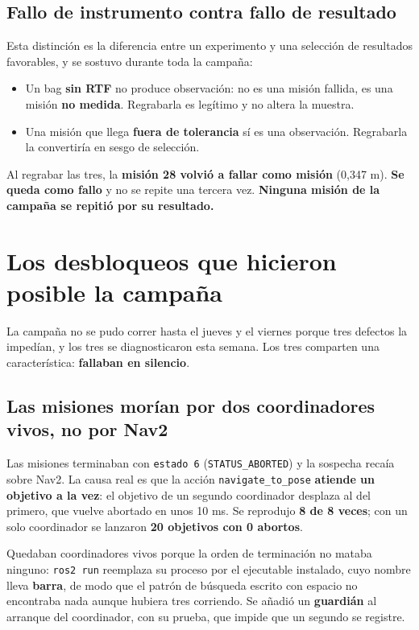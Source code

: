 \documentclass[12pt,letterpaper]{article}
\begin{document}
\subsection{Fallo de instrumento contra fallo de resultado}

Esta distinción es la diferencia entre un experimento y una selección de resultados favorables, y se sostuvo durante toda la campaña:

\begin{itemize}[leftmargin=*]
    \item Un bag \textbf{sin RTF} no produce observación: no es una misión fallida, es una misión \textbf{no medida}. Regrabarla es legítimo y no altera la muestra.
    \item Una misión que llega \textbf{fuera de tolerancia} sí es una observación. Regrabarla la convertiría en sesgo de selección.
\end{itemize}

Al regrabar las tres, la \textbf{misión 28 volvió a fallar como misión} (0,347 m). \textbf{Se queda como fallo} y no se repite una tercera vez. \textbf{Ninguna misión de la campaña se repitió por su resultado.}

\section{Los desbloqueos que hicieron posible la campaña}
\label{sec:desbloqueos}

La campaña no se pudo correr hasta el jueves y el viernes porque tres defectos la impedían, y los tres se diagnosticaron esta semana. Los tres comparten una característica: \textbf{fallaban en silencio}.

\subsection{Las misiones morían por dos coordinadores vivos, no por Nav2}

Las misiones terminaban con \texttt{estado 6} (\texttt{STATUS\_ABORTED}) y la sospecha recaía sobre Nav2. La causa real es que la acción \texttt{navigate\_to\_pose} \textbf{atiende un objetivo a la vez}: el objetivo de un segundo coordinador desplaza al del primero, que vuelve abortado en unos 10 ms. Se reprodujo \textbf{8 de 8 veces}; con un solo coordinador se lanzaron \textbf{20 objetivos con 0 abortos}.

Quedaban coordinadores vivos porque la orden de terminación no mataba ninguno: \texttt{ros2 run} reemplaza su proceso por el ejecutable instalado, cuyo nombre lleva \textbf{barra}, de modo que el patrón de búsqueda escrito con espacio no encontraba nada aunque hubiera tres corriendo. Se añadió un \textbf{guardián} al arranque del coordinador, con su prueba, que impide que un segundo se registre.
\end{document}
